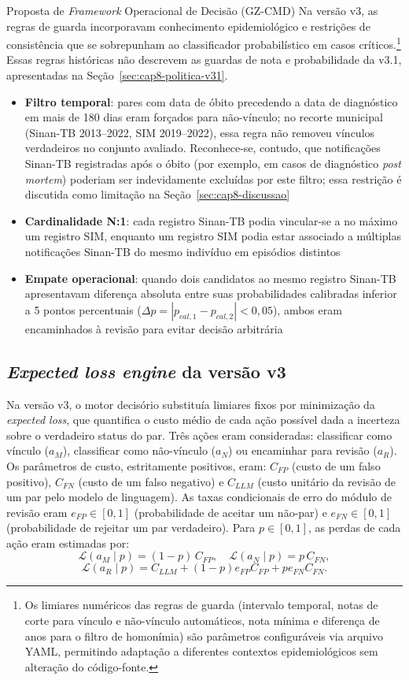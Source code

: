 \begin{chapter}{Proposta de \textit{Framework} Operacional de Decisão (GZ-CMD)}
Na versão v3, as regras de guarda incorporavam conhecimento epidemiológico e restrições de consistência que se sobrepunham ao classificador probabilístico em casos críticos.\footnote{Os limiares numéricos das regras de guarda (intervalo temporal, notas de corte para vínculo e não-vínculo automáticos, nota mínima e diferença de anos para o filtro de homonímia) são parâmetros configuráveis via arquivo YAML, permitindo adaptação a diferentes contextos epidemiológicos sem alteração do código-fonte.} Essas regras históricas não descrevem as guardas de nota e probabilidade da v3.1, apresentadas na Seção~\ref{sec:cap8-politica-v31}.

\begin{itemize}
\item \textbf{Filtro temporal}: pares com data de óbito precedendo a data de diagnóstico em mais de 180 dias eram forçados para não-vínculo; no recorte municipal (Sinan-TB 2013--2022, SIM 2019--2022), essa regra não removeu vínculos verdadeiros no conjunto avaliado. Reconhece-se, contudo, que notificações Sinan-TB registradas após o óbito (por exemplo, em casos de diagnóstico \textit{post mortem}) poderiam ser indevidamente excluídas por este filtro; essa restrição é discutida como limitação na Seção~\ref{sec:cap8-discussao}
\item \textbf{Cardinalidade N:1}: cada registro Sinan-TB podia vincular-se a no máximo um registro SIM, enquanto um registro SIM podia estar associado a múltiplas notificações Sinan-TB do mesmo indivíduo em episódios distintos
\item \textbf{Empate operacional}: quando dois candidatos ao mesmo registro Sinan-TB apresentavam diferença absoluta entre suas probabilidades calibradas inferior a 5 pontos percentuais ($\Delta p = |p_{cal,1} - p_{cal,2}| < 0{,}05$), ambos eram encaminhados à revisão para evitar decisão arbitrária
\end{itemize}

\subsection{\textit{Expected loss engine} da versão v3}
\label{sec:cap8-motor-politica}

Na versão v3, o motor decisório substituía limiares fixos por minimização da \textit{expected loss}, que quantifica o custo médio de cada ação possível dada a incerteza sobre o verdadeiro status do par. Três ações eram consideradas: classificar como vínculo ($a_M$), classificar como não-vínculo ($a_N$) ou encaminhar para revisão ($a_R$). Os parâmetros de custo, estritamente positivos, eram: $C_{FP}$ (custo de um falso positivo), $C_{FN}$ (custo de um falso negativo) e $C_{LLM}$ (custo unitário da revisão de um par pelo modelo de linguagem). As taxas condicionais de erro do módulo de revisão eram $e_{FP}\in[0,1]$ (probabilidade de aceitar um não-par) e $e_{FN}\in[0,1]$ (probabilidade de rejeitar um par verdadeiro). Para $p\in[0,1]$, as perdas de cada ação eram estimadas por:
\[
\mathcal{L}(a_M\mid p)=(1-p)\,C_{FP},
\quad
\mathcal{L}(a_N\mid p)=p\,C_{FN},
\]
\[
\mathcal{L}(a_R\mid p)=C_{LLM}+(1-p)e_{FP}C_{FP}+pe_{FN}C_{FN}.
\]


\end{chapter}
